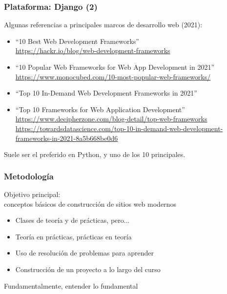 
\begin{frame}
\frametitle{Plataforma: Django (2)}

{\large Algunas referencias a principales marcos de desarrollo web (2021):}

\vspace{0.5cm}

\begin{itemize}
\item ``10 Best Web Development Frameworks'' \\
  {\small \url{https://hackr.io/blog/web-development-frameworks}}
\item ``10 Popular Web Frameworks for Web App Development in 2021'' \\
  {\small \url{https://www.monocubed.com/10-most-popular-web-frameworks/}}
\item ``Top 10 In-Demand Web Development Frameworks in 2021'' \\
\item ``Top 10 Frameworks for Web Application Development'' \\
  {\small \url{https://www.decipherzone.com/blog-detail/top-web-frameworks}}
  {\small \url{https://towardsdatascience.com/top-10-in-demand-web-development-frameworks-in-2021-8a5b668be0d6}}
\end{itemize}

\vspace{1cm}
{\large Suele ser el preferido en Python, y uno de los 10 principales.}

\end{frame}


\begin{frame}
\frametitle{Metodología}

{\Large
  \begin{center}
    Objetivo principal: \\
    conceptos básicos de construcción de sitios web modernos \\
  \end{center}

  \vspace{0.5cm}
\begin{itemize}
\item Clases de teoría y de prácticas, pero...
\item Teoría en prácticas, prácticas en teoría
\item Uso de resolución de problemas para aprender
\item Construcción de un proyecto a lo largo del curso
\end{itemize}

  \vspace{0.5cm}

\begin{center}
  Fundamentalmente, entender lo fundamental
\end{center}
}
\end{frame}

